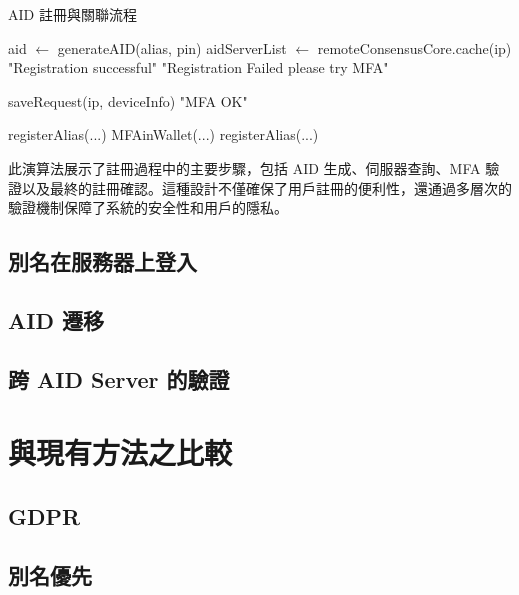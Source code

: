 \begin{algorithm}
  \caption{AID 註冊與關聯流程}
  \begin{algorithmic}[1]
    \State aid $\gets$ generateAID(alias, pin)
    \State aidServerList $\gets$ remoteConsensusCore.cache(ip)
    \State \Return "Registration successful"
    \EndIf
    \EndFor
    \State \Return "Registration Failed please try MFA"
    \EndFunction

    \State saveRequest(ip, deviceInfo)
    \State \Return "MFA OK"
    \EndFunction

    \State registerAlias(...) 
    \State MFAinWallet(...) 
    \State registerAlias(...) 
    \EndFunction
  \end{algorithmic}
\end{algorithm}

此演算法展示了註冊過程中的主要步驟，包括 AID 生成、伺服器查詢、MFA 驗證以及最終的註冊確認。這種設計不僅確保了用戶註冊的便利性，還通過多層次的驗證機制保障了系統的安全性和用戶的隱私。

\subsection{別名在服務器上登入}
\subsection{AID 遷移}
\subsection{跨 AID Server 的驗證}

\section{與現有方法之比較}
\subsection{GDPR}
\subsection{別名優先}
